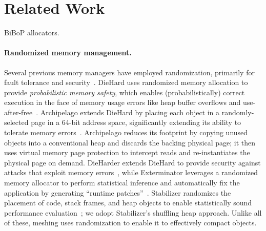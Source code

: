 \section{Related Work}
\label{sec:related}

BiBoP allocators.

\paragraph{Randomized memory management.} Several previous memory managers have employed randomization,
primarily for fault tolerance and
security~\cite{Novark:2010:DSH:1866307.1866371, 1134000, 1346296,
  1250736}. DieHard uses randomized memory allocation to provide
\emph{probabilistic memory safety}, which enables (probabilistically)
correct execution in the face of memory usage errors like heap buffer
overflows and use-after-free~\cite{1134000}. Archipelago extends
DieHard by placing each object in a randomly-selected page in a 64-bit
address space, significantly extending its ability to tolerate memory
errors~\cite{1346296}. Archipelago reduces its footprint by copying
unused objects into a conventional heap and discards the backing
physical page; it then uses virtual memory page protection to
intercept reads and re-instantiates the physical page on
demand. DieHarder extends DieHard to provide security against attacks
that exploit memory errors~\cite{Novark:2010:DSH:1866307.1866371},
while Exterminator leverages a randomized memory allocator to perform
statistical inference and automatically fix the application by
generating ``runtime patches''~\cite{1250736}. Stabilizer randomizes
the placement of code, stack frames, and heap objects to enable
statistically sound performance evaluation~\cite{stabilizer:asplos13};
we adopt Stabilizer's shuffling heap approach. Unlike all of these,
meshing uses randomization to enable it to effectively compact objects.

